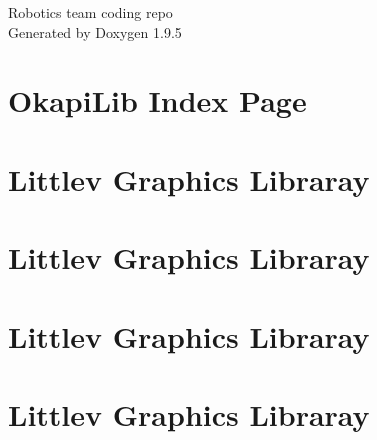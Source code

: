 \documentclass[twoside]{book}
\newcommand{\+}{\discretionary{\mbox{\scriptsize$\hookleftarrow$}}{}{}}
\newcommand{\clearemptydoublepage}{%
    \newpage{\pagestyle{empty}\cleardoublepage}%
  }
\begin{document}
  \raggedbottom
    \hypersetup{pageanchor=false,
                bookmarksnumbered=true,
                pdfencoding=unicode
               }
  \begin{titlepage}
  \vspace*{7cm}
  \begin{center}%
  {\Large Robotics team coding repo}\\
  \vspace*{1cm}
  {\large Generated by Doxygen 1.9.5}\\
  \end{center}
  \end{titlepage}
  \clearemptydoublepage
  \tableofcontents
  \clearemptydoublepage
  \hypersetup{pageanchor=true}
\chapter{Okapi\+Lib Index Page}
\label{index}\hypertarget{index}{}
\chapter{Littlev Graphics Libraray}
\label{md__pros__pros_7_13_22_include_display__r_e_a_d_m_e}

\chapter{Littlev Graphics Libraray}
\label{md__pros__pros_7_9_22_include_display__r_e_a_d_m_e}

\chapter{Littlev Graphics Libraray}
\label{md__pros_test_3_include_display__r_e_a_d_m_e}

\chapter{Littlev Graphics Libraray}
\label{md__pros_test_5_include_display__r_e_a_d_m_e}

\end{document}
